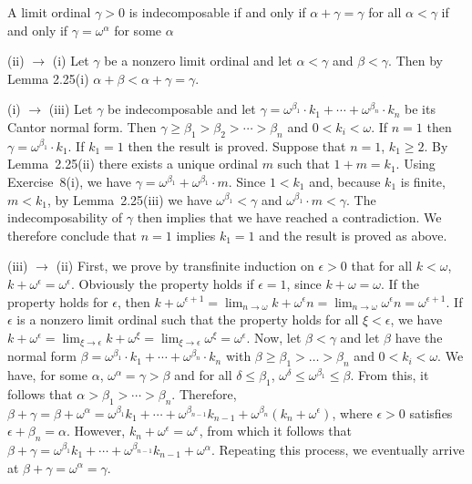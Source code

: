  A limit ordinal $\gamma > 0$ is indecomposable if and only if 
$\alpha + \gamma = \gamma$ for all $\alpha < \gamma$ if and only if 
$\gamma = \omega^\alpha$ for some $\alpha$
\begin{solution}
(ii) $\rightarrow$ (i) Let $\gamma$ be a nonzero limit ordinal and let 
$\alpha < \gamma$ and $\beta < \gamma$. Then by Lemma 2.25(i) 
$\alpha + \beta < \alpha + \gamma = \gamma$.

(i) $\rightarrow$ (iii) Let $\gamma$ be indecomposable and let 
$\gamma = \omega^{\beta_1} \cdot k_1 + \cdots + \omega^{\beta_n} \cdot k_n$ be 
its Cantor normal form. Then 
$\gamma \geq \beta_1 > \beta_2 > \cdots > \beta_n$ and $0 < k_i < \omega$. If 
$n = 1$ then $\gamma = \omega^{\beta_1} \cdot k_1$. If $k_1 = 1$ then the 
result is proved. Suppose that $n = 1$, $k_1 \geq 2$. By Lemma~2.25(ii) there 
exists a unique ordinal $m$ such that $1 + m = k_1$. Using Exercise~8(i), we 
have $\gamma = \omega^{\beta_1} + \omega^{\beta_1} \cdot m$. Since $1 < k_1$ 
and, because $k_1$ is finite, $m < k_1$, by Lemma~2.25(iii) we have 
$\omega^{\beta_1} < \gamma$ and $\omega^{\beta_1} \cdot m < \gamma$. The 
indecomposability of $\gamma$ then implies that we have reached a 
contradiction. We therefore conclude that $n = 1$ implies $k_1 = 1$ and the 
result is proved as above.

(iii) $\rightarrow$ (ii) First, we prove by transfinite induction on 
$\epsilon > 0$ that for all $k < \omega$, 
$k + \omega^\epsilon = \omega^\epsilon$. Obviously the property holds if 
$\epsilon = 1$, since $k + \omega = \omega$. If the property holds for 
$\epsilon$, then $k + \omega^{\epsilon + 1} = \lim_{n \rightarrow \omega} k 
+ \omega^\epsilon n = \lim_{n \rightarrow \omega} \omega^\epsilon n 
= \omega^{\epsilon + 1}$. If $\epsilon$ is a nonzero limit ordinal such that 
the property holds for all $\xi < \epsilon$, we have 
$k + \omega^\epsilon = \lim_{\xi \rightarrow \epsilon} k + \omega^\xi 
= \lim_{\xi \rightarrow \epsilon} \omega^\xi = \omega^\epsilon$. Now, let 
$\beta < \gamma$ and let $\beta$ have the normal form 
$\beta = \omega^{\beta_1} \cdot k_1 + \cdots + \omega^{\beta_n} \cdot k_n$ with
$\beta \geq \beta_1 > \dots > \beta_n$ and $0 < k_i < \omega$. We have, for 
some $\alpha$, $\omega^\alpha = \gamma > \beta$ and for all 
$\delta \leq \beta_1$, $\omega^\delta \leq \omega^{\beta_1} \leq \beta$. From 
this, it follows that $\alpha > \beta_1 > \cdots > \beta_n$. Therefore, 
$\beta + \gamma = \beta +  \omega^\alpha = \omega^{\beta_1} k_1 + \cdots 
+ \omega^{\beta_{n - 1}} k_{n - 1} + \omega^{\beta_n} (k_n + \omega^\epsilon)$,
where $\epsilon > 0$ satisfies $\epsilon + \beta_n = \alpha$. However, 
$k_n + \omega^\epsilon = \omega^\epsilon$, from which it follows that 
$\beta + \gamma = \omega^{\beta_1} k_1 + \cdots 
+ \omega^{\beta_{n - 1}} k_{n - 1} + \omega^\alpha$. Repeating this process, we
eventually arrive at $\beta + \gamma = \omega^\alpha = \gamma$.
\end{solution}

